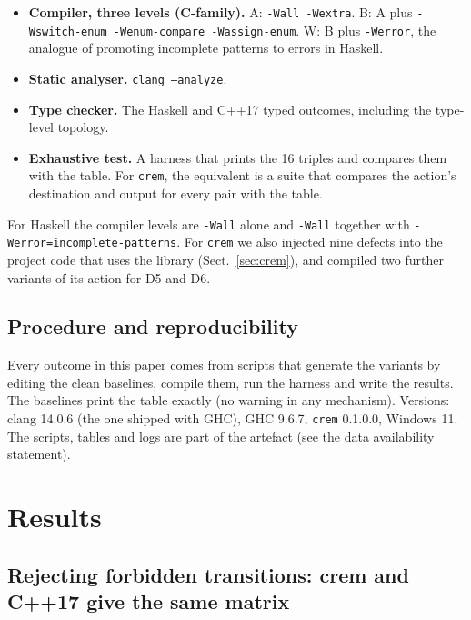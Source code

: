 \documentclass[review,12pt]{elsarticle}
\newcommand{\code}[1]{\texttt{#1}}
\newcommand{\crem}{\texttt{crem}}
\begin{document}
\begin{itemize}
\item \textbf{Compiler, three levels (C-family).} A: \code{-Wall -Wextra}. B: A plus \code{-Wswitch-enum -Wenum-compare -Wassign-enum}. W: B plus \code{-Werror}, the analogue of promoting incomplete patterns to errors in Haskell.
\item \textbf{Static analyser.} \code{clang --analyze}.
\item \textbf{Type checker.} The Haskell and C++17 typed outcomes, including the type-level topology.
\item \textbf{Exhaustive test.} A harness that prints the 16 triples and compares them with the table. For \crem{}, the equivalent is a suite that compares the action's destination and output for every pair with the table.
\end{itemize}

\begin{sloppypar}
For Haskell the compiler levels are \code{-Wall} alone and \code{-Wall} together with \code{-Werror=}\allowbreak\code{incomplete-}\allowbreak\code{patterns}. For \crem{} we also injected nine defects into the project code that uses the library (Sect.~\ref{sec:crem}), and compiled two further variants of its action for D5 and D6.
\end{sloppypar}

\subsection{Procedure and reproducibility}

Every outcome in this paper comes from scripts that generate the variants by editing the clean baselines, compile them, run the harness and write the results. The baselines print the table exactly (no warning in any mechanism). Versions: clang 14.0.6 (the one shipped with GHC), GHC 9.6.7, \code{crem} 0.1.0.0, Windows 11. The scripts, tables and logs are part of the artefact (see the data availability statement).

\section{Results}
\label{sec:results}

\subsection{Rejecting forbidden transitions: crem and C++17 give the same matrix}
\label{sec:matrix}
\end{document}
